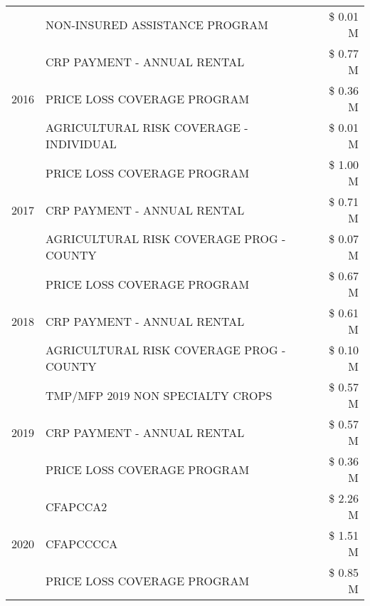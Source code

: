\begin{tabular}{llr}
 & NON-INSURED ASSISTANCE PROGRAM & \$ 0.01 M \\
\cline{1-3}
\multirow[t]{3}{*}{2016} & CRP PAYMENT - ANNUAL RENTAL                   & \$ 0.77 M \\
 & PRICE LOSS COVERAGE PROGRAM                   & \$ 0.36 M \\
 & AGRICULTURAL RISK COVERAGE - INDIVIDUAL       & \$ 0.01 M \\
\cline{1-3}
\multirow[t]{3}{*}{2017} & PRICE LOSS COVERAGE PROGRAM & \$ 1.00 M \\
 & CRP PAYMENT - ANNUAL RENTAL & \$ 0.71 M \\
 & AGRICULTURAL RISK COVERAGE PROG - COUNTY & \$ 0.07 M \\
\cline{1-3}
\multirow[t]{3}{*}{2018} & PRICE LOSS COVERAGE PROGRAM & \$ 0.67 M \\
 & CRP PAYMENT - ANNUAL RENTAL & \$ 0.61 M \\
 & AGRICULTURAL RISK COVERAGE PROG - COUNTY & \$ 0.10 M \\
\cline{1-3}
\multirow[t]{3}{*}{2019} & TMP/MFP 2019 NON SPECIALTY CROPS & \$ 0.57 M \\
 & CRP PAYMENT - ANNUAL RENTAL & \$ 0.57 M \\
 & PRICE LOSS COVERAGE PROGRAM & \$ 0.36 M \\
\cline{1-3}
\multirow[t]{3}{*}{2020} & CFAPCCA2 & \$ 2.26 M \\
 & CFAPCCCCA & \$ 1.51 M \\
 & PRICE LOSS COVERAGE PROGRAM & \$ 0.85 M \\
\cline{1-3}
\bottomrule
\end{tabular}
